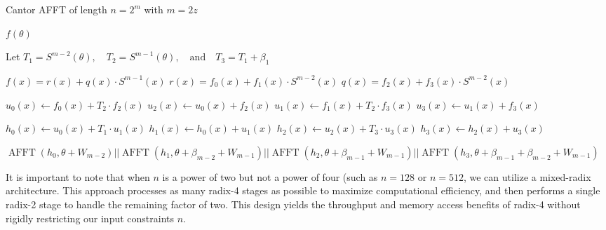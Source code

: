 \documentclass[11pt,runningheads]{llncs}
\DeclareMathOperator{\fft}{AFFT} %
\begin{document}
\begin{algorithm}[H]
    \caption{Cantor AFFT of length $n = 2^m$ with $m=2z$}\label{Algo:CantorRadix4}
    \SetAlgoLined
    { \scriptsize
    \KwOut{$\fft(f, \theta+W_m)$.}

    {
        \Return $f(\theta)$\;
    }
    
    Let $T_1 = S^{m-2}(\theta), \quad T_2= S^{m-1}(\theta), \quad \text{and} \quad T_3 = T_1 + \beta_1$ 

    $f(x) = r(x) + q(x) \cdot S^{m-1}(x)$\;
    $r(x) = f_0(x) + f_1(x) \cdot S^{m-2}(x)$\;
    $q(x) = f_2(x) + f_3(x) \cdot S^{m-2}(x)$\;

    $u_0(x) \gets f_0(x) + T_2 \cdot f_2(x)$\;
    $u_2(x) \gets u_0(x) + f_2(x)$\;
    $u_1(x) \gets f_1(x) + T_2 \cdot f_3(x)$\;
    $u_3(x) \gets u_1(x) + f_3(x)$\;
    
    $h_0(x) \gets u_0(x) + T_1 \cdot u_1(x)$\;
    $h_1(x) \gets h_0(x) + u_1(x)$\;
    $h_2(x) \gets u_2(x) + T_3 \cdot u_3(x)$\;
    $h_3(x) \gets h_2(x) + u_3(x)$\;
    
    \Return $\fft(h_0,\theta+W_{m-2})||\fft(h_1, \theta+\beta_{m-2}+ W_{m-1})||\fft(h_2, \theta+\beta_{m-1}+ W_{m-1})||\fft(h_3, \theta+\beta_{m-1}+\beta_{m-2}+ W_{m-1})$\;
    }
\end{algorithm}

\begin{remark}
    It is important to note that when $n$ is a power of two but not a power of four (such as $n=128$ or $n=512$, we can utilize a mixed-radix architecture. This approach processes as many radix-4 stages as possible to maximize computational efficiency, and then performs a single radix-2 stage to handle the remaining factor of two. This design yields the throughput and memory access benefits of radix-4 without rigidly restricting our input constraints $n$.
\end{remark}
\end{document}
